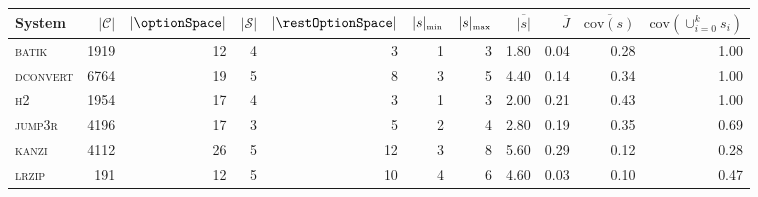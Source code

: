 \begin{tabular}{lrrrrrrrrrr}
\toprule
\multicolumn{1}{l}{System} &  $|\mathcal{C}|$ &  \multicolumn{1}{r}{$|\optionSpace|$} &  $|\mathcal{S}|$ &  \multicolumn{1}{r}{$|\restOptionSpace|$} &  $|s|_{\text{\tiny min}}$ &  $|s|_{\text{\tiny max}}$ &  \multicolumn{1}{r}{$\overline{|s|}$} &  $\overline{J}$ &  $\overline{\text{cov}(s)}$ &  ${\text{cov}(\cup_{i=0}^k s_i)}$ \\
\midrule
            \textsc{batik} &             1919 &                                    12 &                4 &                                         3 &                         1 &                         3 &                                  1.80 &            0.04 &                        0.28 &                              1.00 \\
         \textsc{dconvert} &             6764 &                                    19 &                5 &                                         8 &                         3 &                         5 &                                  4.40 &            0.14 &                        0.34 &                              1.00 \\
               \textsc{h2} &             1954 &                                    17 &                4 &                                         3 &                         1 &                         3 &                                  2.00 &            0.21 &                        0.43 &                              1.00 \\
           \textsc{jump3r} &             4196 &                                    17 &                3 &                                         5 &                         2 &                         4 &                                  2.80 &            0.19 &                        0.35 &                              0.69 \\
            \textsc{kanzi} &             4112 &                                    26 &                5 &                                        12 &                         3 &                         8 &                                  5.60 &            0.29 &                        0.12 &                              0.28 \\
            \textsc{lrzip} &              191 &                                    12 &                5 &                                        10 &                         4 &                         6 &                                  4.60 &            0.03 &                        0.10 &                              0.47 \\

\end{tabular}
